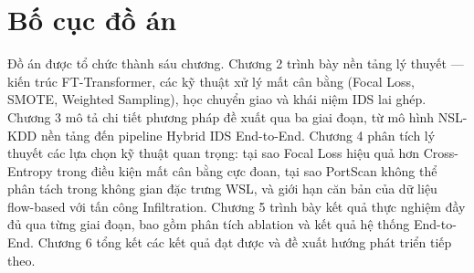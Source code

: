 \documentclass[../DoAn.tex]{subfiles}
\begin{document}
\section{Bố cục đồ án}
\label{sec:bc}

Đồ án được tổ chức thành sáu chương. Chương 2 trình bày nền tảng lý thuyết --- kiến trúc FT-Transformer, các kỹ thuật xử lý mất cân bằng (Focal Loss, SMOTE, Weighted Sampling), học chuyển giao và khái niệm IDS lai ghép. Chương 3 mô tả chi tiết phương pháp đề xuất qua ba giai đoạn, từ mô hình NSL-KDD nền tảng đến pipeline Hybrid IDS End-to-End. Chương 4 phân tích lý thuyết các lựa chọn kỹ thuật quan trọng: tại sao Focal Loss hiệu quả hơn Cross-Entropy trong điều kiện mất cân bằng cực đoan, tại sao PortScan không thể phân tách trong không gian đặc trưng WSL, và giới hạn căn bản của dữ liệu flow-based với tấn công Infiltration. Chương 5 trình bày kết quả thực nghiệm đầy đủ qua từng giai đoạn, bao gồm phân tích ablation và kết quả hệ thống End-to-End. Chương 6 tổng kết các kết quả đạt được và đề xuất hướng phát triển tiếp theo.
\end{document}
